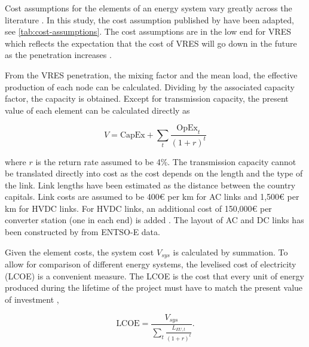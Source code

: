 \documentclass[a4paper, 5p, sort&compress]{elsarticle}%
\newcommand{\paren}[1]{\left(#1\right)}
\begin{document}

Cost assumptions for the elements of an energy system vary greatly
across the literature \cite{Sensitivity}. In this study, the cost assumption published by
\cite{Rolando} have been adapted, see \cref{tab:cost-assumptions}. The cost
assumptions are in the low end for VRES which reflects the expectation
that the cost of VRES will go down in the future as the penetration
increases \cite{Fraunhofer}.



From the VRES penetration, the mixing factor and the mean load, the
effective production of each node can be calculated. Dividing by the
associated capacity factor, the capacity is obtained. Except for
transmission capacity, the present value of each element can be
calculated directly as

\begin{equation}
  \label{eq:6}
  V = \text{CapEx} + \sum_{t} \frac{\text{OpEx}_{t}}{\paren{1 + r}^{t}}
\end{equation}

where $r$ is the return rate assumed to be 4\%. The transmission
capacity cannot be translated directly into cost as the cost depends
on the length and the type of the link. Link lengths have been
estimated as the distance between the country capitals. Link costs are
assumed to be 400\euro{}
per km for AC links and 1,500\euro{}
per km for HVDC links. For HVDC links, an additional cost of
150,000\euro{}
per converter station (one in each end) is
added \cite{McKinsey, Schaber, Schaber2}. The layout of AC and
DC links has been constructed by \cite{rolando2014} from ENTSO-E data.


Given the element costs, the system cost $V_{sys}$ is calculated by
summation. To allow for comparison of different energy systems, the
levelised cost of electricity (LCOE) is a convenient measure. The LCOE
is the cost that every unit of energy produced during the lifetime of
the project must have to match the present value of
investment \cite{Short1995},

\begin{equation}
  \label{eq:7}
  \text{LCOE} = \frac{V_{sys}}{\sum_{t} \frac{L_{EU,
        t}}{\paren{1+r}^{t}}} .
\end{equation}
\end{document}
